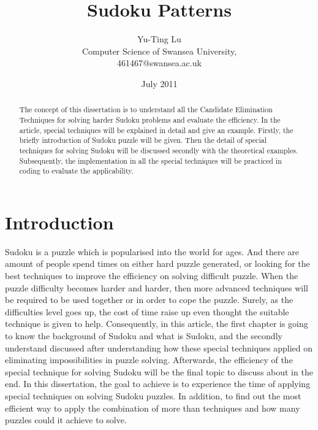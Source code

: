 \documentclass[11pt]{report}
\begin{document}
\title{Sudoku Patterns}
\author{Yu-Ting Lu\\
 Computer Science of Swansea University,\\
 461467@swansea.ac.uk}
\date{July 2011}
\maketitle

\begin{abstract}
The concept of this dissertation is to understand all the Candidate Elimination Techniques for solving harder Sudoku problems and evaluate the efficiency. In the article, special techniques will be explained in detail and give an example.
Firstly, the briefly introduction of Sudoku puzzle will be given. Then the detail of special techniques for solving Sudoku will be discussed secondly with the theoretical examples.
Subsequently, the implementation in all the special techniques will be practiced in coding to evaluate the applicability.
\end{abstract}


\tableofcontents



\chapter{Introduction}
\label{cha:Introduction}


Sudoku is a puzzle which is popularised into the world for ages. And there are amount of people spend times on either hard puzzle generated, or looking for the best techniques to improve the efficiency on solving difficult puzzle.
When the puzzle difficulty becomes harder and harder, then more advanced techniques will be required to be used together or in order to cope the puzzle. Surely, as the difficulties level goes up, the cost of time raise up even thought the suitable technique is given to help. Consequently, in this article, the first chapter is going to know the background of Sudoku and what is Sudoku, and the secondly understand discussed after understanding how these special techniques applied on eliminating impossibilities in puzzle solving. Afterwards, the efficiency of the special technique for solving Sudoku will be the final topic to discuss about in the end.
In this dissertation, the goal to achieve is to experience the time of applying special techniques on solving Sudoku puzzles. In addition, to find out the most efficient way to apply the combination of more than techniques and how many puzzles could it achieve to solve.
\end{document}
